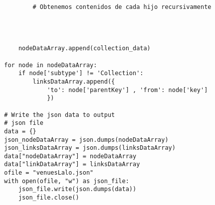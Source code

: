 \begin{code}
\begin{verbatim}
                # Obtenemos contenidos de cada hijo recursivamente
    
    
    
            
            nodeDataArray.append(collection_data) 
        
        for node in nodeDataArray:
            if node['subtype'] != 'Collection':
                linksDataArray.append({
                    'to': node['parentKey'] , 'from': node['key']
                    })
            
        # Write the json data to output  
        # json file 
        data = {}
        json_nodeDataArray = json.dumps(nodeDataArray)
        json_linksDataArray = json.dumps(linksDataArray) 
        data["nodeDataArray"] = nodeDataArray 
        data["linkDataArray"] = linksDataArray
        ofile = "venuesLalo.json"
        with open(ofile, "w") as json_file:
            json_file.write(json.dumps(data))             
            json_file.close() 
    
\end{verbatim}
\end{code}
